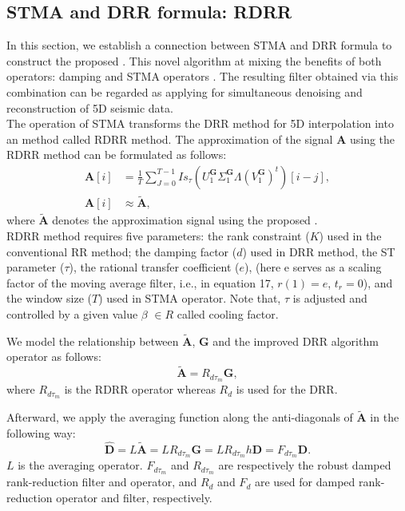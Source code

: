 \subsection*{ STMA and DRR formula: RDRR}

In this section, we establish a connection between STMA and DRR formula to construct the proposed . This novel algorithm  at mixing the benefits of both operators: damping and STMA operators . The resulting filter obtained via this combination can be regarded as applying   for simultaneous denoising and reconstruction of 5D seismic data.\\
The operation of STMA transforms the DRR method for 5D interpolation into an  method called RDRR method. The approximation of the signal $\mathbf{A}$ using the RDRR method can be formulated as follows:
\begin{align}
\nonumber
\mathbf{A}[i] & =\frac{1}{T}\sum_{J=0}^{T-1}Is_{\tau}\left(U^{\mathbf{G}}_1\Sigma^{\mathbf{G}}_{1}\Lambda(V^{\mathbf{G}}_1)^{{t}}\right)\left[i-j\right],\\
\mathbf{A}[i]&\approx \mathbf{\tilde{A}},
\end{align}   
where $\mathbf{\tilde{A}}$ denotes the approximation signal using the proposed .\\
 RDRR method requires five  parameters: the rank constraint ($K$) used in the conventional RR method; the damping factor ($d$) used in DRR method, the ST parameter ($\tau$), the rational transfer  coefficient ($e$), (here e serves as a scaling factor
of the moving average filter, i.e., in equation 17, $r(1) = e$, $t_r = 0$), and the window size ($T$) used in STMA operator. Note that, $\tau$ is adjusted and controlled by a given value {$\beta$} {$\in R$} called  cooling factor.    

We model the relationship between $\mathbf{\tilde{A}}$, $\mathbf{{G}}$ and the improved DRR algorithm operator as follows:
\begin{equation}
\mathbf{\tilde{A}}={R}_{d\tau_m}{\mathbf{{G}}}, 
\end{equation}
where ${R}_{d\tau_m}$ is the RDRR operator whereas ${R}_d$ is used for the DRR.

Afterward, we apply the averaging function \citep{chen2016open} along the anti-diagonals of $\mathbf{\tilde{A}}$ in the following way:
\begin{equation}
\mathbf{\hat{D}}={L}\mathbf{\tilde{A}}={L}{R}_{d\tau_m}\mathbf{G}={{L}}{{R}}_{d\tau_m}{{{h}}\mathbf{D}}={F}_{d\tau_m}\mathbf{D}.
\end{equation}
${L} $ is the averaging operator. ${F}_{d\tau_m}$ and ${R}_{d\tau_m}$ are respectively the robust damped rank-reduction filter and operator, and ${R}_d$ and ${F}_d$ are used for damped rank-reduction operator and filter, respectively.

